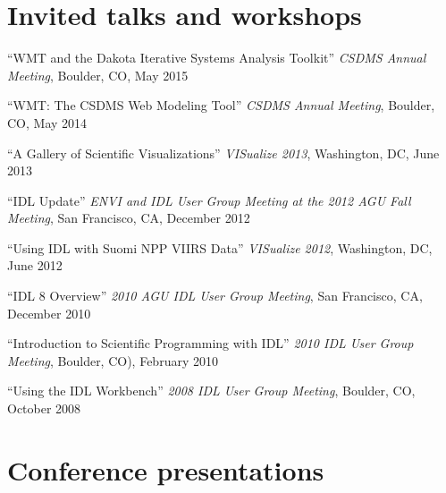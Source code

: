 \documentclass[letterpaper]{resume}
\begin{document}
\nocite{*}




\section{Invited talks and workshops}

\vspace{1.0em}
\begin{compactitem}[\itembullet]
  \item ``WMT and the Dakota Iterative Systems Analysis Toolkit''
    \textit{CSDMS Annual Meeting}, Boulder, CO, May 2015
  \item ``WMT: The CSDMS Web Modeling Tool'' \textit{CSDMS Annual
    Meeting}, Boulder, CO, May 2014
  \item ``A Gallery of Scientific Visualizations'' \textit{VISualize
    2013}, Washington, DC, June 2013
  \item ``IDL Update'' \textit{ENVI and IDL User Group Meeting at the
    2012 AGU Fall Meeting}, San Francisco, CA, December 2012
  \item ``Using IDL with Suomi NPP VIIRS Data'' \textit{VISualize
    2012}, Washington, DC, June 2012
  \item ``IDL 8 Overview'' \textit{2010 AGU IDL User Group Meeting},
    San Francisco, CA, December 2010
  \item ``Introduction to Scientific Programming with IDL''
    \textit{2010 IDL User Group Meeting}, Boulder, CO), February 2010
  \item ``Using the IDL Workbench'' \textit{2008 IDL User Group
    Meeting}, Boulder, CO, October 2008
\end{compactitem}


\section{Conference presentations}
\end{document}

